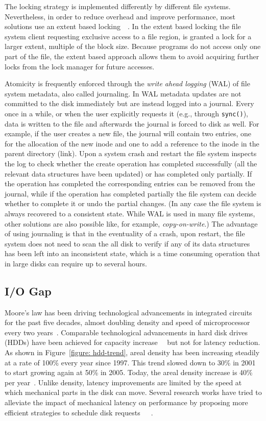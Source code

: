 The locking strategy is implemented differently by different file systems. Nevertheless, in order to reduce overhead and improve performance, most solutions use an extent based locking~\cite{Braam02}~\cite{SchmuckH02}. In the 
extent based locking the file system client requesting exclusive access to a file region, is granted a lock for a larger extent, multiple of the block size. Because programs do not access only one part of the file, the extent 
based approach allows them to avoid acquiring further locks from the lock manager for future accesses.

Atomicity is frequently enforced through the \textit{write ahead logging} (WAL) of file system metadata, also called journaling. In WAL metadata updates are not committed to the disk immediately but are instead logged into a 
journal. Every once in a while, or when the user explicitly requests it (e.g., through \texttt{sync()}), data is written to the file and afterwards the journal is forced to disk as well. For example, if the user creates a 
new file, the journal will contain two entries, one for the allocation of the new inode and one to add a reference to the inode in the parent directory (link). Upon a system crash and restart the file system inspects the 
log to check whether the create operation has completed successfully (all the relevant data structures have been updated) or has completed only partially. If the operation has completed the corresponding entries can be removed 
from the journal, while if the operation has completed partially the file system can decide whether to complete it or undo the partial changes. (In any case the file system is always recovered to a consistent state. While WAL 
is used in many file systems, other solutions are also possible like, for example, \textit{copy-on-write}.) The advantage of using journaling is that in the eventuality of a crash, upon restart, the file system does not need 
to scan the all disk to verify if any of its data structures has been left into an inconsistent state, which is a time consuming operation that in large disks can require up to several hours.

\subsection{I/O Gap}
Moore's law has been driving technological advancements in integrated circuits for the past five decades, almost doubling density and speed of microprocessor every two years~\cite{Mack11}. Comparable technological advancements 
in hard disk drives (HDDs) have been achieved for capacity increase~\cite{Grochowski1996}~\cite{NIST} but not for latency reduction. As shown in Figure~\ref{figure: hdd-trend}, areal density has been increasing steadily at a 
rate of 100\% every year since 1997. This trend slowed down to 30\% in 2001 to start growing again at 50\% in 2005. Today, the areal density increase is 40\% per year~\cite{Masakatsu2015}. Unlike density, latency improvements 
are limited by the speed at which mechanical parts in the disk can move. Several research works have tried to alleviate the impact of mechanical latency on performance by proposing more efficient strategies to schedule disk 
requests~\cite{jacobson1991}~\cite{Worthington1994}~\cite{Iyer2001}.

